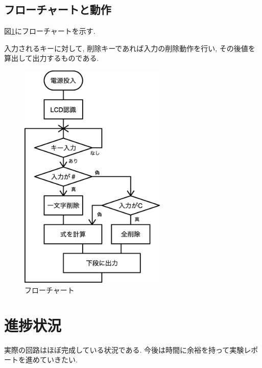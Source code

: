 \documentclass[]{jsarticle}
\begin{document}
    \subsection{フローチャートと動作}
        図\ref{fig:flowchart}にフローチャートを示す.

        入力されるキーに対して, 削除キーであれば入力の削除動作を行い,
        その後値を算出して出力するものである.

        \begin{figure}[h]
            \centering
            \includegraphics[width=7cm]{images/flowchart.eps}
            \caption{フローチャート}
            \label{fig:flowchart}
        \end{figure}

\section{進捗状況}
    実際の回路はほぼ完成している状況である.
    今後は時間に余裕を持って実験レポートを進めていきたい.
\end{document}
